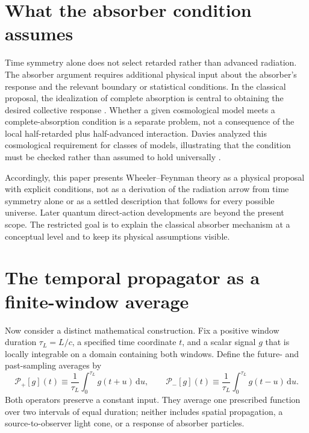 \documentclass[12pt]{article}
\begin{document}
\section{What the absorber condition assumes}

Time symmetry alone does not select retarded rather than advanced radiation. The absorber argument requires additional physical input about the absorber's response and the relevant boundary or statistical conditions. In the classical proposal, the idealization of complete absorption is central to obtaining the desired collective response \cite{WheelerFeynman1945}. Whether a given cosmological model meets a complete-absorption condition is a separate problem, not a consequence of the local half-retarded plus half-advanced interaction. Davies analyzed this cosmological requirement for classes of models, illustrating that the condition must be checked rather than assumed to hold universally \cite{Davies1972}.

Accordingly, this paper presents Wheeler--Feynman theory as a physical proposal with explicit conditions, not as a derivation of the radiation arrow from time symmetry alone or as a settled description that follows for every possible universe. Later quantum direct-action developments are beyond the present scope. The restricted goal is to explain the classical absorber mechanism at a conceptual level and to keep its physical assumptions visible.

\section{The temporal propagator as a finite-window average}

Now consider a distinct mathematical construction. Fix a positive window duration $\tau_L=L/c$, a specified time coordinate $t$, and a scalar signal $g$ that is locally integrable on a domain containing both windows. Define the future- and past-sampling averages by
\begin{equation}
  \mathcal{P}_{+}[g](t)
  \equiv\frac{1}{\tau_L}\int_0^{\tau_L}g(t+u)\,\mathrm{d}u,
  \qquad
  \mathcal{P}_{-}[g](t)
  \equiv\frac{1}{\tau_L}\int_0^{\tau_L}g(t-u)\,\mathrm{d}u.
  \label{eq:window-definitions}
\end{equation}
Both operators preserve a constant input. They average one prescribed function over two intervals of equal duration; neither includes spatial propagation, a source-to-observer light cone, or a response of absorber particles.
\end{document}
